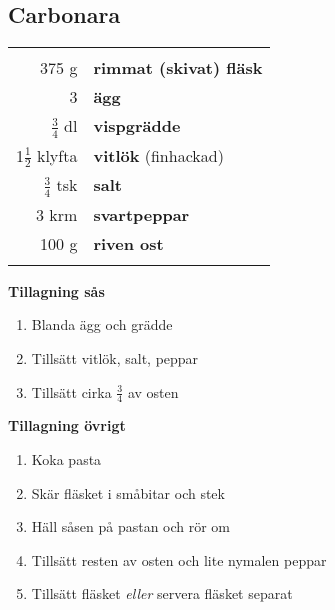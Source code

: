 \clearpage

\subsection{Carbonara}

\begin{table}[H]
	\begin{tabular}{rl}
	\hline
	&\\
		375 g & \textbf{rimmat (skivat) fläsk}\\
		3 & \textbf{ägg}\\
		$\frac{3}{4}$ dl & \textbf{vispgrädde}\\
		1$\frac{1}{2}$ klyfta & \textbf{vitlök} (finhackad)\\
		$\frac{3}{4}$ tsk & \textbf{salt}\\
		3 krm & \textbf{svartpeppar}\\
		100 g & \textbf{riven ost}\\
	&\\
	\hline
	\end{tabular}
\end{table}


\begin{multicols*}{2}

\noindent \textbf{Tillagning sås}
\begin{enumerate}
	\itemsep0cm
	\item Blanda ägg och grädde
	\item Tillsätt vitlök, salt, peppar
	\item Tillsätt cirka $\frac{3}{4}$ av osten
\end{enumerate}

\noindent \textbf{Tillagning övrigt}
\begin{enumerate}
	\itemsep0cm
	\item Koka pasta
	\item Skär fläsket i småbitar och stek
	\item Häll såsen på pastan och rör om
	\item Tillsätt resten av osten och lite nymalen peppar
	\item Tillsätt fläsket \textit{eller} servera fläsket separat
\end{enumerate}

\end{multicols*}

\clearpage